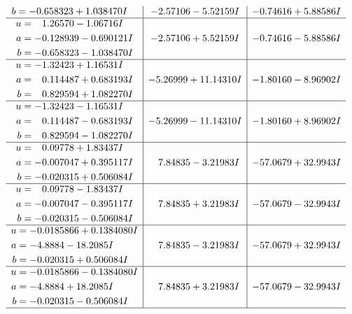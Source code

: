 \documentclass[1p]{elsarticle_modified}
\theoremstyle{definition}
\begin{document}
$$\begin{array}{c|c|c}
\begin{aligned}
b &= -0.658323 + 1.038470 I\end{aligned}
 & -2.57106 - 5.52159 I & -0.74616 + 5.88586 I \\ \hline\begin{aligned}
u &= \phantom{-}1.26570 - 1.06716 I \\
a &= -0.128939 - 0.690121 I \\
b &= -0.658323 - 1.038470 I\end{aligned}
 & -2.57106 + 5.52159 I & -0.74616 - 5.88586 I \\ \hline\begin{aligned}
u &= -1.32423 + 1.16531 I \\
a &= \phantom{-}0.114487 + 0.683193 I \\
b &= \phantom{-}0.829594 + 1.082270 I\end{aligned}
 & -5.26999 + 11.14310 I & -1.80160 - 8.96902 I \\ \hline\begin{aligned}
u &= -1.32423 - 1.16531 I \\
a &= \phantom{-}0.114487 - 0.683193 I \\
b &= \phantom{-}0.829594 - 1.082270 I\end{aligned}
 & -5.26999 - 11.14310 I & -1.80160 + 8.96902 I \\ \hline\begin{aligned}
u &= \phantom{-}0.09778 + 1.83437 I \\
a &= -0.007047 + 0.395117 I \\
b &= -0.020315 + 0.506084 I\end{aligned}
 & \phantom{-}7.84835 - 3.21983 I & -57.0679 + 32.9943 I \\ \hline\begin{aligned}
u &= \phantom{-}0.09778 - 1.83437 I \\
a &= -0.007047 - 0.395117 I \\
b &= -0.020315 - 0.506084 I\end{aligned}
 & \phantom{-}7.84835 + 3.21983 I & -57.0679 - 32.9943 I \\ \hline\begin{aligned}
u &= -0.0185866 + 0.1384080 I \\
a &= -4.8884 - 18.2085 I \\
b &= -0.020315 + 0.506084 I\end{aligned}
 & \phantom{-}7.84835 - 3.21983 I & -57.0679 + 32.9943 I \\ \hline\begin{aligned}
u &= -0.0185866 - 0.1384080 I \\
a &= -4.8884 + 18.2085 I \\
b &= -0.020315 - 0.506084 I\end{aligned}
 & \phantom{-}7.84835 + 3.21983 I & -57.0679 - 32.9943 I\\
 \hline 
 \end{array}$$\newpage\newpage\renewcommand{\arraystretch}{1}
\end{document}
